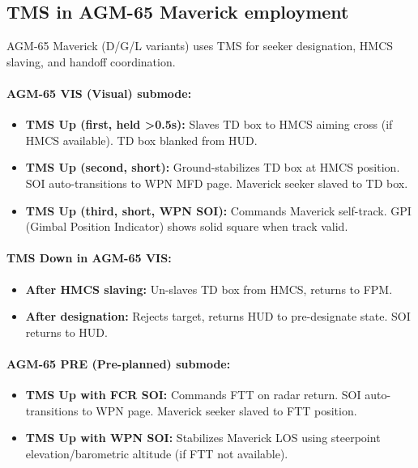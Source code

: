 \documentclass[11pt, a4paper, twoside]{report}
\begin{document}
\subsection{TMS in AGM-65 Maverick employment}
\label{sec:C4-S5-S1}

AGM-65 Maverick (D/G/L variants) uses TMS for seeker designation, HMCS slaving, and handoff coordination.

\paragraph{AGM-65 VIS (Visual) submode:}
\begin{itemize}
    \item \textbf{TMS Up (first, held >0.5s):} Slaves TD box to HMCS aiming cross (if HMCS available). TD box blanked from HUD.
    \item \textbf{TMS Up (second, short):} Ground-stabilizes TD box at HMCS position. SOI auto-transitions to WPN MFD page. Maverick seeker slaved to TD box.
    \item \textbf{TMS Up (third, short, WPN SOI):} Commands Maverick self-track. GPI (Gimbal Position Indicator) shows solid square when track valid.
\end{itemize}

\paragraph{TMS Down in AGM-65 VIS:}
\begin{itemize}
    \item \textbf{After HMCS slaving:} Un-slaves TD box from HMCS, returns to FPM.
    \item \textbf{After designation:} Rejects target, returns HUD to pre-designate state. SOI returns to HUD.
\end{itemize}

\paragraph{AGM-65 PRE (Pre-planned) submode:}
\begin{itemize}
    \item \textbf{TMS Up with FCR SOI:} Commands FTT on radar return. SOI auto-transitions to WPN page. Maverick seeker slaved to FTT position.
    \item \textbf{TMS Up with WPN SOI:} Stabilizes Maverick LOS using steerpoint elevation/barometric altitude (if FTT not available).
\end{itemize}
\end{document}
